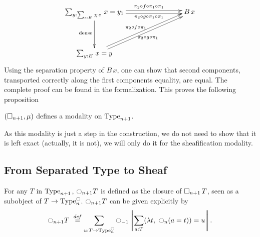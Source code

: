 \[\xymatrix@C=8em@R=4em{
  \sumD y {\sumD e E {\chi\,
  e}} {x=y_1} \ar@<2pt>[r]^{\qquad \pi_2\circ f\circ\pi_1\circ \pi_1}
\ar@<-2pt>[r]_{\qquad \pi_2\circ g\circ \pi_1\circ \pi_1}
\ar[d]_{\mathrm{dense}}& B\,x \\
  \sumD y E {x = y} \ar@<2pt>[ur]^{\pi_2\circ f\circ \pi_1} \ar@<-2pt>[ur]_{\pi_2\circ g\circ \pi_1}&
}\]%
Using the separation property of $B\,x$, one can show that second
components, transported correctly along the first components equality,
are equal. The complete proof can be found in the formalization.
This proves the following proposition
\begin{prop}\label{prop:sep-mod}
  $(\mathop{\square_{n+1}},\mu)$ defines a modality on $\operatorname{Type}_{n+1}$.
\end{prop}

As this modality is just a step in the construction, we do not need to
show that it is left exact (actually, it is not), we will only do it for the sheafification
modality.

\subsection{From Separated Type to Sheaf}
\label{ssec:separated-to-sheaf}

For any $T$ in $\operatorname{Type}_{n+1}$, 
$\ocircle_{n+1}T$ is defined as the closure of $\mathop{\square_{n+1}} T$,
seen as a subobject of $T \to \operatorname{Type}_n^{\ocircle}$. 
%
$\ocircle_{n+1}T$ can be given explicitly by
\[
\ocircle_{n+1} T \ \overset{de\hspace{-0.2ex}f}{=} \sum_{u:T \to \operatorname{Type}_n^{\ocircle}} \ocircle_{-1}\left\| \sum_{a:T} 
            (\lambda t,~\ocircle_n (a=t)) = u\right\|.
\]%

